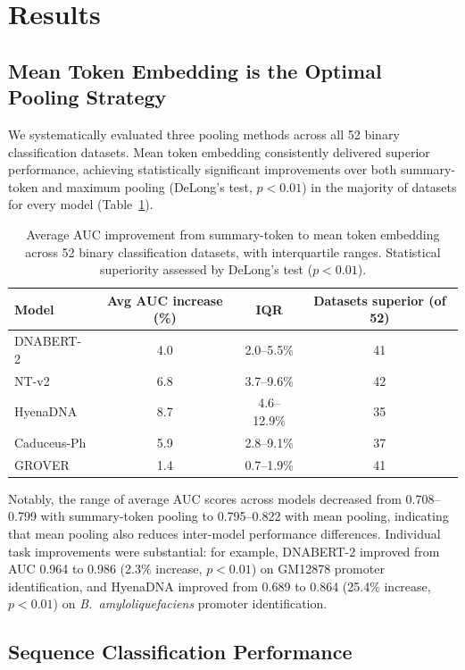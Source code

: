 \documentclass[11pt]{article}
\begin{document}
\section{Results}

\subsection{Mean Token Embedding is the Optimal Pooling Strategy}

We systematically evaluated three pooling methods across all 52 binary classification datasets. Mean token embedding consistently delivered superior performance, achieving statistically significant improvements over both summary-token and maximum pooling (DeLong's test, $p < 0.01$) in the majority of datasets for every model (Table~\ref{tab:pooling}).

\begin{table}[htbp]
\centering
\caption{Average AUC improvement from summary-token to mean token embedding across 52 binary classification datasets, with interquartile ranges. Statistical superiority assessed by DeLong's test ($p < 0.01$).}
\label{tab:pooling}
\begin{tabular}{lccc}
\toprule
Model & Avg AUC increase (\%) & IQR & Datasets superior (of 52) \\
\midrule
DNABERT-2 & 4.0 & 2.0--5.5\% & 41 \\
NT-v2 & 6.8 & 3.7--9.6\% & 42 \\
HyenaDNA & 8.7 & 4.6--12.9\% & 35 \\
Caduceus-Ph & 5.9 & 2.8--9.1\% & 37 \\
GROVER & 1.4 & 0.7--1.9\% & 41 \\
\bottomrule
\end{tabular}
\end{table}

Notably, the range of average AUC scores across models decreased from 0.708--0.799 with summary-token pooling to 0.795--0.822 with mean pooling, indicating that mean pooling also reduces inter-model performance differences. Individual task improvements were substantial: for example, DNABERT-2 improved from AUC 0.964 to 0.986 (2.3\% increase, $p < 0.01$) on GM12878 promoter identification, and HyenaDNA improved from 0.689 to 0.864 (25.4\% increase, $p < 0.01$) on \textit{B.~amyloliquefaciens} promoter identification.

\subsection{Sequence Classification Performance}
\end{document}
